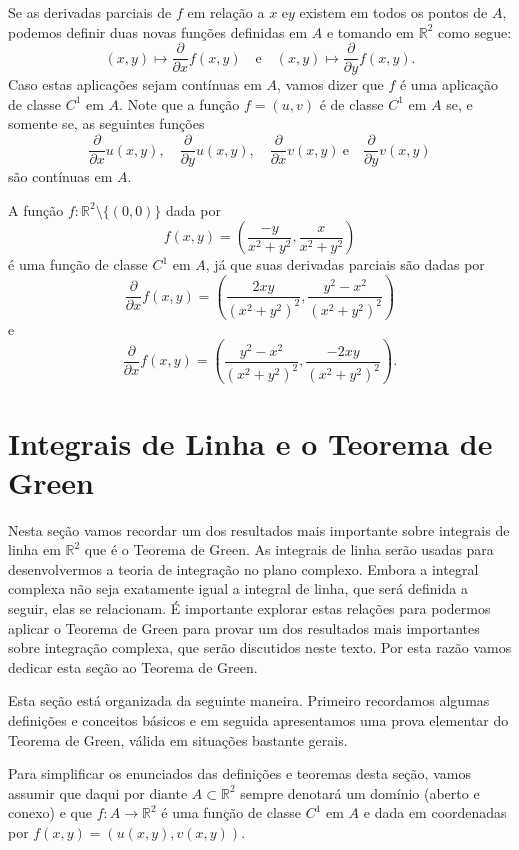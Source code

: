 Se as derivadas parciais de $f$ em relação a $x$ e$y$ existem em todos os pontos de $A$,
podemos definir duas novas funções definidas em $A$ e tomando em $\mathbb{R}^2$ como segue:
\[
(x,y)\longmapsto \frac{\partial}{\partial x}f(x,y)
\quad \text{e}\quad 
(x,y)\longmapsto \frac{\partial}{\partial y}f(x,y).
\]
Caso estas aplicações sejam contínuas em $A$, vamos dizer que $f$ é uma aplicação 
de classe $C^1$ em $A$. Note que a função $f=(u,v)$ é de classe $C^1$ em $A$ 
se, e somente se, as seguintes funções 
\[
\frac{\partial}{\partial x}u(x,y),
\quad
\frac{\partial}{\partial y}u(x,y),
\quad 
\frac{\partial}{\partial x}v(x,y)
\ \text{e}\quad 
\frac{\partial}{\partial y}v(x,y)
\]
são contínuas em $A$.

\begin{exemplo} A função $f:\mathbb{R}^2\setminus\{(0,0)\}$ dada por 
\[
f(x,y)
=
\left( \frac{-y}{x^2+y^2}, \frac{x}{x^2+y^2} \right)
\]
é uma função de classe $C^1$ em $A$, já que suas derivadas parciais são dadas por 
\[
\frac{\partial}{\partial x}f(x,y)
=
\left( \frac{2xy}{(x^2+y^2)^2}, \frac{y^2-x^2}{(x^2+y^2)^2}  \right)
\]
e
\[
\frac{\partial}{\partial x}f(x,y)
=
\left( \frac{y^2-x^2}{(x^2+y^2)^2}, \frac{-2xy}{(x^2+y^2)^2}  \right).
\]
\end{exemplo}


\section{Integrais de Linha e o Teorema de Green}

Nesta seção vamos recordar um dos resultados mais importante sobre integrais de linha 
em $\mathbb{R}^2$ que é o Teorema de Green. As integrais de linha serão usadas para
desenvolvermos a teoria de integração no plano complexo. Embora a integral complexa não seja 
exatamente igual a integral de linha, que será definida a seguir, elas se relacionam. 
É importante explorar estas relações para podermos aplicar o Teorema de Green 
para provar um dos resultados mais importantes sobre integração complexa, 
que serão discutidos neste texto. Por esta razão vamos dedicar esta seção ao 
Teorema de Green. 

Esta seção está organizada da seguinte maneira. Primeiro recordamos algumas 
definições e conceitos básicos e em seguida apresentamos uma prova elementar 
do Teorema de Green, válida em situações bastante gerais. 


\bigskip 


Para simplificar os enunciados das definições e teoremas desta seção, 
vamos assumir que daqui por diante 
$A\subset\mathbb{R}^2$ sempre denotará um domínio (aberto e conexo) e
que $f:A\to\mathbb{R}^2$ é 
uma função de classe $C^1$ em $A$ e dada em coordenadas por $f(x,y)=(u(x,y),v(x,y))$.

